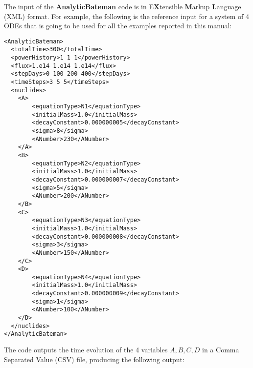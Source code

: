 The input of the \textbf{AnalyticBateman} code is in E\textbf{X}tensible \textbf{M}arkup \textbf{L}anguage (XML) format. 
For example, the following is the reference input for a system of 4 ODEs that is going to be used for all the examples reported in this manual: 

\begin{lstlisting}[style=XML]
<AnalyticBateman>
  <totalTime>300</totalTime>
  <powerHistory>1 1 1</powerHistory>
  <flux>1.e14 1.e14 1.e14</flux>
  <stepDays>0 100 200 400</stepDays>
  <timeSteps>3 5 5</timeSteps>
  <nuclides>
    <A>
        <equationType>N1</equationType>
        <initialMass>1.0</initialMass>
        <decayConstant>0.000000005</decayConstant>
        <sigma>8</sigma>
        <ANumber>230</ANumber>
    </A>
    <B>
        <equationType>N2</equationType>
        <initialMass>1.0</initialMass>
        <decayConstant>0.000000007</decayConstant>
        <sigma>5</sigma>
        <ANumber>200</ANumber>
    </B>
    <C>
        <equationType>N3</equationType>
        <initialMass>1.0</initialMass>
        <decayConstant>0.000000008</decayConstant>
        <sigma>3</sigma>
        <ANumber>150</ANumber>
    </C>
    <D>
        <equationType>N4</equationType>
        <initialMass>1.0</initialMass>
        <decayConstant>0.000000009</decayConstant>
        <sigma>1</sigma>
        <ANumber>100</ANumber>
    </D>
  </nuclides>
</AnalyticBateman>
\end{lstlisting}
The code outputs the time evolution of the 4 variables $A,B,C,D$ in a Comma Separated Value (CSV) file, producing the following output:
